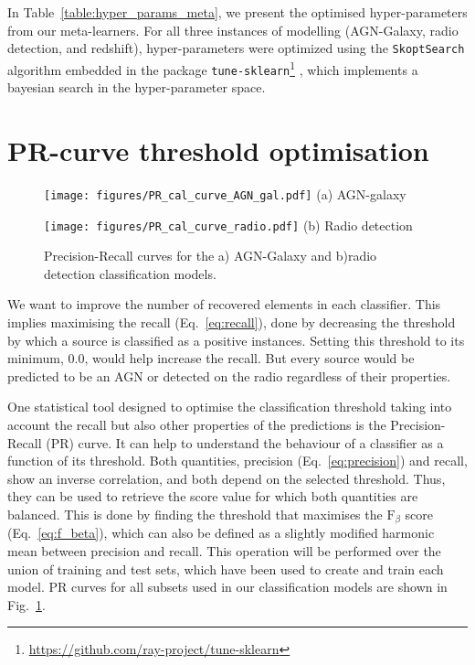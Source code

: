 \documentclass{aa}
\begin{document}
\begin{appendix}
In Table~\ref{table:hyper_params_meta}, we present the optimised hyper-parameters from our meta-learners. For all three instances of modelling (AGN-Galaxy, radio detection, and redshift), hyper-parameters were optimized using the \verb|SkoptSearch| algorithm embedded in the package \verb|tune-sklearn|\footnote{\url{https://github.com/ray-project/tune-sklearn}} \citep[\texttt{v0.4.1};][]{head_tim_2021_5565057}, which implements a bayesian search in the hyper-parameter space.

\section{PR-curve threshold optimisation}\label{sec:app_pr_curve}

\begin{figure}
  \centering
  \begin{minipage}{0.23\textwidth}
    \centering
    \texttt{[image: figures/PR\_cal\_curve\_AGN\_gal.pdf]}\hfill\break
    {(a) AGN-galaxy} 
  \end{minipage}
  \hfill 
  \begin{minipage}{0.23\textwidth}
    \centering
    \texttt{[image: figures/PR\_cal\_curve\_radio.pdf]}\hfill\break
    {(b) Radio detection}
  \end{minipage}
  \centering
  \caption{Precision-Recall curves for the a) AGN-Galaxy and b)radio detection classification models.}
  \label{fig:PR_curves_classification}
\end{figure}

We want to improve the number of recovered elements in each classifier. This implies maximising the recall (Eq.~\ref{eq:recall}), done by decreasing the threshold by which a source is classified as a positive instances. Setting this threshold to its minimum, $0.0$, would help increase the recall. But every source would be predicted to be an AGN or detected on the radio regardless of their properties.%

One statistical tool designed to optimise the classification threshold taking into account the recall but also other properties of the predictions is the Precision-Recall (PR) curve. It can help to understand the behaviour of a classifier as a function of its threshold. Both quantities, precision (Eq.~\ref{eq:precision}) and recall, show an inverse correlation, and both depend on the selected threshold. Thus, they can be used to retrieve the score value for which both quantities are balanced. This is done by finding the threshold that maximises the $\mathrm{F}_{\beta}$ score (Eq.~\ref{eq:f_beta}), which can also be defined as a slightly modified harmonic mean between precision and recall. This operation will be performed over the union of training and test sets, which have been used to create and train each model. PR curves for all subsets used in our classification models are shown in Fig.~\ref{fig:PR_curves_classification}.


\end{appendix}
\end{document}
